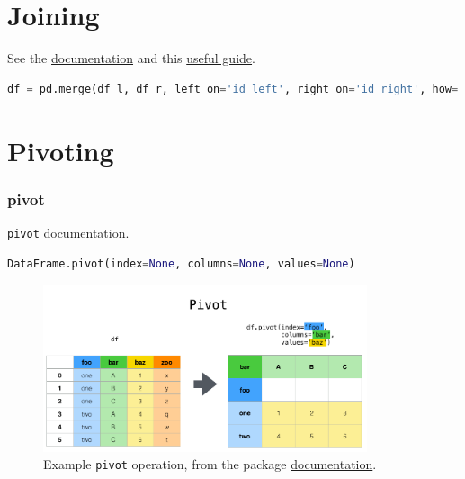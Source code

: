 \section{Joining}
\label{pandas:join}

\noindent See the \href{https://pandas.pydata.org/pandas-docs/stable/user_guide/merging.html}{documentation} and this \href{http://chrisalbon.com/python/data_wrangling/pandas_join_merge_dataframe/}{useful guide}.

\begin{lstlisting}[language=Python]
df = pd.merge(df_l, df_r, left_on='id_left', right_on='id_right', how='left')
\end{lstlisting}

\section{Pivoting}
\label{pandas:pivoting}

\subsubsection{pivot}
\label{pandas:pivoting:pivot}

\noindent \href{http://pandas.pydata.org/pandas-docs/stable/reference/api/pandas.DataFrame.pivot.html}{\texttt{pivot} documentation}.

\begin{lstlisting}[language=Python]
DataFrame.pivot(index=None, columns=None, values=None)
\end{lstlisting}

\begin{figure}[H]
\centering
\includegraphics[width=0.85\textwidth]{figures/pandas/reshaping_pivot.png}
\caption{
Example \pandas \texttt{pivot} operation, from the package \href{http://pandas.pydata.org/pandas-docs/stable/user_guide/reshaping.html}{documentation}.
}
\label{fig:pandas:pivot}
\end{figure}

